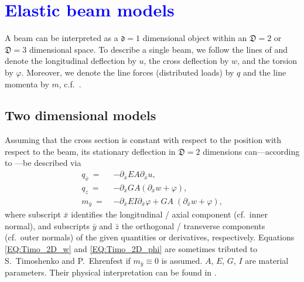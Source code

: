 \documentclass[a4paper, english, 12pt, reqno, draft]{amsart}
\theoremstyle{definition}
\theoremstyle{remark}
\numberwithin{equation}{section}
\newcommand{\locDim}{\ensuremath{\mathfrak d}}
\newcommand{\globDim}{\ensuremath{\mathfrak D}}
\newcommand{\longDef}{\ensuremath{u}}
\newcommand{\crossDef}{\ensuremath{w}}
\newcommand{\torsion}{\ensuremath{\varphi}}
\newcommand{\force}{\ensuremath{q}}
\newcommand{\momentum}{\ensuremath{m}}
\begin{document}
% 
% 
\newpage
% 
\section{\textcolor{blue}{Elastic beam models}}
% 
A beam can be interpreted as a $\locDim = 1$ dimensional object within an $\globDim = 2$ or $\globDim = 3$ dimensional space. To describe a single beam, we follow the lines of \cite[Sect.~1.2.3]{MeskourisH2013} and denote the longitudinal deflection by $\longDef$, the cross deflection by $\crossDef$, and the torsion by $\torsion$. Moreover, we denote the line forces (distributed loads) by $\force$ and the line momenta by $\momentum$, c.f.~\cite[Sect.~1.2.2]{MeskourisH2013}.
% 
\subsection{Two dimensional models}\label{SEC:2d_Ber}
% 
Assuming that the cross section is constant with respect to the position with respect to the beam, its stationary deflection in $\globDim = 2$ dimensions can---according to \cite[Sect.~1.4.3]{MeskourisH2013}---be described via
% 
\begin{subequations}\label{EQ:Timo_2D}
 \begin{align}
  \force_{\bar x} ~=~ & - \partial_{\bar x} EA \partial_{\bar x} \longDef, \label{EQ:beam_long_Timo}\\
  \force_{\bar z} ~=~ & - \partial_{\bar x} GA ( \partial_{\bar x} \crossDef + \torsion ), \label{EQ:Timo_2D_w}\\
  \momentum_{\bar y} ~=~ & - \partial_{\bar x} EI \partial_{\bar x} \torsion + GA \; ( \partial_{\bar x} \crossDef + \torsion ), \label{EQ:Timo_2D_phi}
 \end{align}
\end{subequations}
% 
where subscript $\bar x$ identifies the longitudinal / axial component (cf.~inner normal), and subscripts $\bar y$ and $\bar z$ the orthogonal / transverse components (cf.~outer normals) of the given quantities or derivatives, respectively. Equations  \eqref{EQ:Timo_2D_w} and \eqref{EQ:Timo_2D_phi} are sometimes tributed to S.~Timoshenko and P.~Ehrenfest if $\momentum_{\bar y} \equiv 0$ is assumed. $A$, $E$, $G$, $I$ are material parameters. Their physical interpretation can be found in \cite[Sect.~1.3.3]{MeskourisH2013}.
\end{document}
